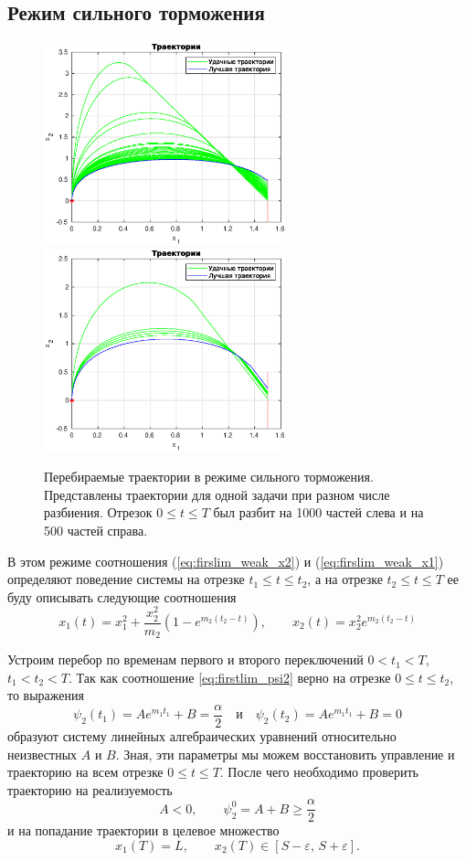 \subsection{Режим сильного торможения}
\begin{figure}[h]
        \hfill
        \includegraphics[width=70mm]{first/strong1.eps}
        \hfill
        \hfill
        \includegraphics[width=70mm]{first/strong2.eps}
        \hfill
        \caption{Перебираемые траектории в режиме сильного торможения. Представлены траектории для одной задачи при разном числе разбиения. Отрезок $0 \leqslant t \leqslant T$ был разбит на 1000 частей слева и на 500 частей справа.}
\end{figure}
В этом режиме соотношения (\ref{eq:firslim_weak_x2}) и (\ref{eq:firslim_weak_x1}) определяют поведение системы на отрезке $t_1 \leqslant t \leqslant t_2$, а на отрезке $t_2 \leqslant t \leqslant T$ ее буду описывать следующие соотношения
\begin{equation}\label{eq:strong}
        x_1(t) =x_1^2 + \frac{x_2^2}{m_2}\left(1 - e^{m_2(t_2-t)}\right),
        \qquad
        x_2(t) = x_2^2e^{m_2(t_2-t)}
\end{equation}

Устроим перебор по временам первого и второго переключений $0 < t_1 < T$, $t_1 < t_2 < T$. Так как соотношение \eqref{eq:firstlim_psi2} верно на отрезке $0 \leqslant t \leqslant t_2$, то выражения
$$
        \psi_2(t_1) = Ae^{m_1t_1} + B = \frac{\alpha}{2}
        \quad \mbox{и} \quad
        \psi_2(t_2) = Ae^{m_1t_1} + B = 0
$$
образуют систему линейных алгебраических уравнений относительно неизвестных $A$ и $B$. Зная, эти параметры мы можем восстановить управление и траекторию на всем отрезке $0 \leqslant t \leqslant T$. После чего необходимо проверить траекторию на реализуемость
$$
        A < 0, \qquad \psi_2^0 = A+B \geqslant \frac{\alpha}{2}
$$
и на попадание траектории в целевое множество
$$
        x_1(T) = L, \qquad x_2(T) \in [S-\varepsilon,\, S+\varepsilon].
$$

